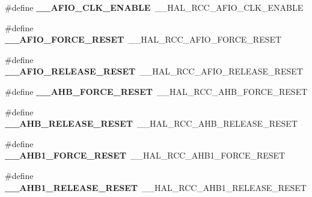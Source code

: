 \begin{DoxyCompactItemize}
\item 
\#define {\bfseries \+\_\+\+\_\+\+A\+F\+I\+O\+\_\+\+C\+L\+K\+\_\+\+E\+N\+A\+B\+LE}~\+\_\+\+\_\+\+H\+A\+L\+\_\+\+R\+C\+C\+\_\+\+A\+F\+I\+O\+\_\+\+C\+L\+K\+\_\+\+E\+N\+A\+B\+LE\hypertarget{group___h_a_l___r_c_c___aliased_gaf4c3e6fd0199c64f366becccf3e7a3ed}{}\label{group___h_a_l___r_c_c___aliased_gaf4c3e6fd0199c64f366becccf3e7a3ed}

\item 
\#define {\bfseries \+\_\+\+\_\+\+A\+F\+I\+O\+\_\+\+F\+O\+R\+C\+E\+\_\+\+R\+E\+S\+ET}~\+\_\+\+\_\+\+H\+A\+L\+\_\+\+R\+C\+C\+\_\+\+A\+F\+I\+O\+\_\+\+F\+O\+R\+C\+E\+\_\+\+R\+E\+S\+ET\hypertarget{group___h_a_l___r_c_c___aliased_ga841e59e167589985ea9819b41bbf6bf3}{}\label{group___h_a_l___r_c_c___aliased_ga841e59e167589985ea9819b41bbf6bf3}

\item 
\#define {\bfseries \+\_\+\+\_\+\+A\+F\+I\+O\+\_\+\+R\+E\+L\+E\+A\+S\+E\+\_\+\+R\+E\+S\+ET}~\+\_\+\+\_\+\+H\+A\+L\+\_\+\+R\+C\+C\+\_\+\+A\+F\+I\+O\+\_\+\+R\+E\+L\+E\+A\+S\+E\+\_\+\+R\+E\+S\+ET\hypertarget{group___h_a_l___r_c_c___aliased_gaadb5113bd9b830d9b8db0fa5764b23af}{}\label{group___h_a_l___r_c_c___aliased_gaadb5113bd9b830d9b8db0fa5764b23af}

\item 
\#define {\bfseries \+\_\+\+\_\+\+A\+H\+B\+\_\+\+F\+O\+R\+C\+E\+\_\+\+R\+E\+S\+ET}~\+\_\+\+\_\+\+H\+A\+L\+\_\+\+R\+C\+C\+\_\+\+A\+H\+B\+\_\+\+F\+O\+R\+C\+E\+\_\+\+R\+E\+S\+ET\hypertarget{group___h_a_l___r_c_c___aliased_ga1cc42f2b9cb1a6c13f6d2453f8fd6451}{}\label{group___h_a_l___r_c_c___aliased_ga1cc42f2b9cb1a6c13f6d2453f8fd6451}

\item 
\#define {\bfseries \+\_\+\+\_\+\+A\+H\+B\+\_\+\+R\+E\+L\+E\+A\+S\+E\+\_\+\+R\+E\+S\+ET}~\+\_\+\+\_\+\+H\+A\+L\+\_\+\+R\+C\+C\+\_\+\+A\+H\+B\+\_\+\+R\+E\+L\+E\+A\+S\+E\+\_\+\+R\+E\+S\+ET\hypertarget{group___h_a_l___r_c_c___aliased_gafd2237a0d990dfe8f203436c0e0315ee}{}\label{group___h_a_l___r_c_c___aliased_gafd2237a0d990dfe8f203436c0e0315ee}

\item 
\#define {\bfseries \+\_\+\+\_\+\+A\+H\+B1\+\_\+\+F\+O\+R\+C\+E\+\_\+\+R\+E\+S\+ET}~\+\_\+\+\_\+\+H\+A\+L\+\_\+\+R\+C\+C\+\_\+\+A\+H\+B1\+\_\+\+F\+O\+R\+C\+E\+\_\+\+R\+E\+S\+ET\hypertarget{group___h_a_l___r_c_c___aliased_ga254ce7a1ec636007ff532aca4f2d7b30}{}\label{group___h_a_l___r_c_c___aliased_ga254ce7a1ec636007ff532aca4f2d7b30}

\item 
\#define {\bfseries \+\_\+\+\_\+\+A\+H\+B1\+\_\+\+R\+E\+L\+E\+A\+S\+E\+\_\+\+R\+E\+S\+ET}~\+\_\+\+\_\+\+H\+A\+L\+\_\+\+R\+C\+C\+\_\+\+A\+H\+B1\+\_\+\+R\+E\+L\+E\+A\+S\+E\+\_\+\+R\+E\+S\+ET\hypertarget{group___h_a_l___r_c_c___aliased_ga86aa3cb593141469e24fb5d133413484}{}\label{group___h_a_l___r_c_c___aliased_ga86aa3cb593141469e24fb5d133413484}


\end{DoxyCompactItemize}
